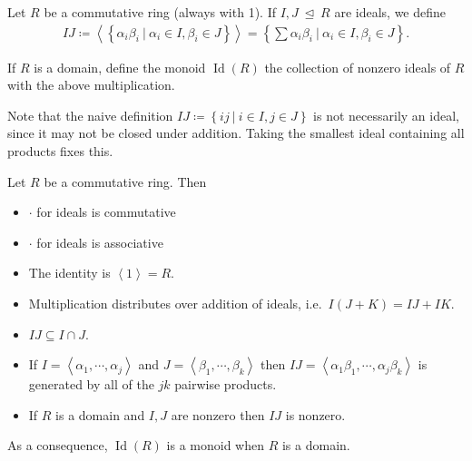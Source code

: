 \begin{definition}

Let \(R\) be a commutative ring (always with 1). If
\(I, J {~\trianglelefteq~}R\) are ideals, we define
\begin{align*}
IJ \coloneqq\left\langle{ \left\{{ \alpha_i \beta_i {~\mathrel{\Big|}~}\alpha_i \in I, \beta_i \in J }\right\}}\right\rangle = \left\{{ \sum \alpha_i \beta_i {~\mathrel{\Big|}~}\alpha_i \in I, \beta_i \in J}\right\}
.\end{align*}

If \(R\) is a domain, define the monoid \(\operatorname{Id}(R)\) the
collection of nonzero ideals of \(R\) with the above multiplication.

\end{definition}

\begin{remark}

Note that the naive definition
\(IJ \coloneqq\left\{{ij{~\mathrel{\Big|}~}i\in I, j\in J}\right\}\) is
not necessarily an ideal, since it may not be closed under addition.
Taking the smallest ideal containing all products fixes this.

\end{remark}

\begin{proposition}[?]

Let \(R\) be a commutative ring. Then

\begin{itemize}
\tightlist
\item
  \(\cdot\) for ideals is commutative
\item
  \(\cdot\) for ideals is associative
\item
  The identity is \(\left\langle{ 1 }\right\rangle= R\).
\item
  Multiplication distributes over addition of ideals,
  i.e.~\(I(J+K) = IJ + IK\).
\item
  \(IJ \subseteq I \cap J\).
\item
  If \(I = \left\langle{ \alpha_1, \cdots, \alpha_j }\right\rangle\) and
  \(J = \left\langle{ \beta_1, \cdots, \beta_k }\right\rangle\) then
  \(IJ = \left\langle{ \alpha_1 \beta_1, \cdots, \alpha_j \beta_k }\right\rangle\)
  is generated by all of the \(jk\) pairwise products.
\item
  If \(R\) is a domain and \(I, J\) are nonzero then \(IJ\) is nonzero.
\end{itemize}

As a consequence, \(\operatorname{Id}(R)\) is a monoid when \(R\) is a
domain.

\end{proposition}

